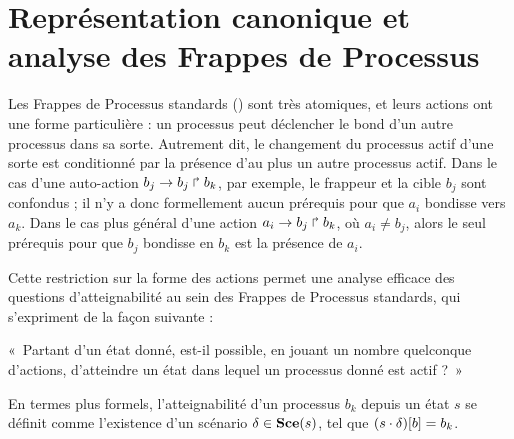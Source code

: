 
\chapter{Représentation canonique et analyse des Frappes de Processus}


Les Frappes de Processus standards () sont très atomiques,
et leurs actions ont une forme particulière :
un processus peut déclencher le bond d'un autre processus dans sa sorte.
Autrement dit, le changement du processus actif d'une sorte est conditionné par la présence
d'au plus un autre processus actif.
Dans le cas d'une auto-action $b_j\rightarrow b_j\Rsh b_k$, par exemple,
le frappeur et la cible $b_j$ sont confondus ;
il n'y a donc formellement aucun prérequis pour que $a_i$ bondisse vers $a_k$.
Dans le cas plus général d'une action $a_i\rightarrow b_j\Rsh b_k$, où $a_i \neq b_j$,
alors le seul prérequis pour que $b_j$ bondisse en $b_k$ est la présence de $a_i$.

Cette restriction sur la forme des actions permet une analyse efficace des questions d'atteignabilité
au sein des Frappes de Processus standards, qui s'expriment de la façon suivante :
\begin{center}
  «~Partant d'un état donné, est-il possible, en jouant un nombre quelconque d'actions,
  d'atteindre un état dans lequel un processus donné est actif ?~»
\end{center}
En termes plus formels, l'atteignabilité d'un processus $b_k$ depuis un état $s$
se définit comme l'existence d'un scénario $\delta \in \mathbf{Sce}(s)$, tel que
${(s \cdot \delta)[b]} = b_k$.

